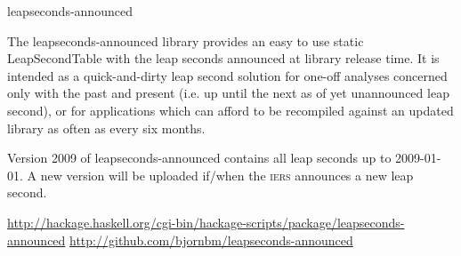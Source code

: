 \documentclass{article}
\begin{document}
\begin{hcarentry}{leapseconds-announced}
\makeheader

The leapseconds-announced library provides an easy to use static Leap\-Second\-Table with the leap seconds announced at library release time. 
It is intended as a quick-and-dirty leap second solution for one-off analyses concerned only with the past and present (i.e. up until the next as of yet unannounced leap second), or for applications which can afford to be recompiled against an updated library as often as every six months.

Version 2009 of leapseconds-announced contains all leap seconds up to 2009-01-01. A new version will be uploaded if/when the \textsc{iers} announces a new leap second.



\FurtherReading
  \url{http://hackage.haskell.org/cgi-bin/hackage-scripts/package/leapseconds-announced}
  \url{http://github.com/bjornbm/leapseconds-announced}
\end{hcarentry}
\end{document}
